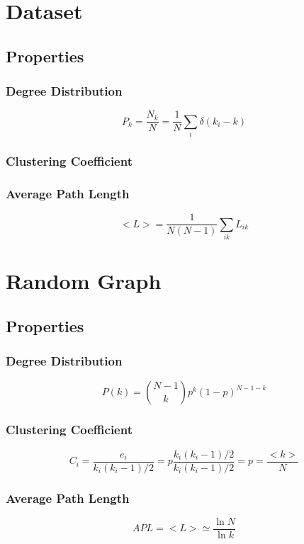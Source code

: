 \documentclass[a4paper,titlepage,11pt]{article}
\begin{document}
\section{Dataset}
\subsection{Properties}
\subsubsection{Degree Distribution}
\[
  P_k = \frac{N_k}{N} = \frac{1}{N}\sum_{i}{\delta(k_i-k)}
\]
\subsubsection{Clustering Coefficient}
\subsubsection{Average Path Length}
\[
  <L> = \frac{1}{N(N-1)}\sum_{ik}{L_{ik}}
\]

\section{Random Graph}
\subsection{Properties}
\subsubsection{Degree Distribution}
\[
  P(k) = {{N-1}\choose{k}} p^{k}(1-p)^{N-1-k}
\]
\subsubsection{Clustering Coefficient}
\[
  C_i = \frac{e_i}{k_i(k_i-1)/2} = p \frac{k_i(k_i-1)/2}{k_i(k_i-1)/2} = p = \frac{<k>}{N} 
\]
\subsubsection{Average Path Length}
\[
  APL = <L> \simeq \frac{\ln{N}}{\ln{k}}
\]
\end{document}
